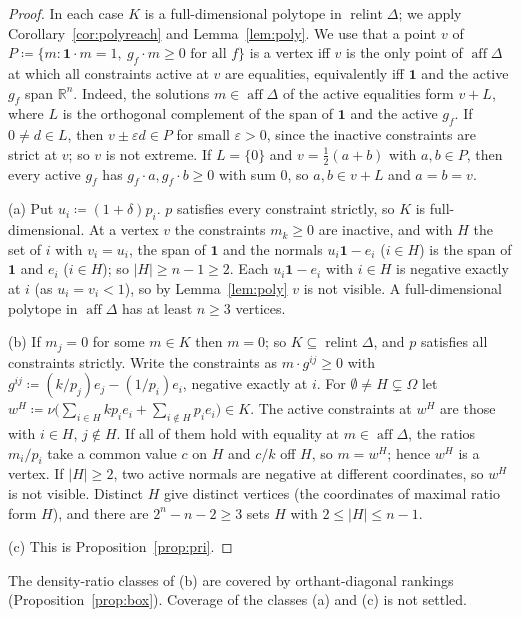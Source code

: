 \documentclass[11pt]{article}
\newcommand{\R}{\mathbb{R}}
\newcommand{\one}{\mathbf{1}}
\DeclareMathOperator{\relint}{relint}
\DeclareMathOperator{\aff}{aff}
\theoremstyle{plain}
\theoremstyle{definition}
\theoremstyle{remark}
\begin{document}
\begin{proof}
In each case $K$ is a full-dimensional polytope in $\relint\Delta$; we apply
Corollary~\ref{cor:polyreach} and Lemma~\ref{lem:poly}. We use that a point $v$ of
$P\coloneqq\{m:\one\cdot m=1,\ g_f\cdot m\ge0\text{ for all }f\}$ is a vertex iff $v$ is
the only point of $\aff\Delta$ at which all constraints active at $v$ are equalities,
equivalently iff $\one$ and the active $g_f$ span $\R^n$. Indeed, the solutions $m\in
\aff\Delta$ of the active equalities form $v+L$, where $L$ is the orthogonal complement
of the span of $\one$ and the active $g_f$. If $0\ne d\in L$, then $v\pm\varepsilon d\in P$
for small $\varepsilon>0$, since the inactive constraints are strict at $v$; so $v$ is
not extreme. If $L=\{0\}$ and $v=\frac12(a+b)$ with $a,b\in P$, then every active $g_f$
has $g_f\cdot a,g_f\cdot b\ge0$ with sum $0$, so $a,b\in v+L$ and $a=b=v$.

(a) Put $u_i\coloneqq(1+\delta)p_i$. $p$ satisfies every constraint strictly, so $K$ is
full-dimensional. At a vertex $v$ the constraints $m_k\ge0$ are inactive, and with $H$ the
set of $i$ with $v_i=u_i$, the span of $\one$ and the normals $u_i\one-e_i$ ($i\in H$)
is the span of $\one$ and $e_i$ ($i\in H$); so $|H|\ge n-1\ge2$. Each $u_i\one-e_i$ with
$i\in H$ is negative exactly at $i$ (as $u_i=v_i<1$), so by Lemma~\ref{lem:poly} $v$ is
not visible. A full-dimensional polytope in $\aff\Delta$ has at least $n\ge3$ vertices.

(b) If $m_j=0$ for some $m\in K$ then $m=0$; so $K\subseteq\relint\Delta$, and $p$
satisfies all constraints strictly. Write the constraints as $m\cdot g^{ij}\ge0$ with
$g^{ij}\coloneqq(k/p_j)e_j-(1/p_i)e_i$, negative exactly at $i$. For $\emptyset\neq H
\subsetneq\Omega$ let $w^H\coloneqq\nu\bigl(\sum_{i\in H}kp_ie_i+\sum_{i\notin H}p_ie_i
\bigr)\in K$. The active constraints at $w^H$ are those with $i\in H$, $j\notin H$. If all
of them hold with equality at $m\in\aff\Delta$, the ratios $m_i/p_i$ take a common value
$c$ on $H$ and $c/k$ off $H$, so $m=w^H$; hence $w^H$ is a vertex. If $|H|\ge2$, two
active normals are negative at different coordinates, so $w^H$ is not visible. Distinct
$H$ give distinct vertices (the coordinates of maximal ratio form $H$), and there are
$2^n-n-2\ge3$ sets $H$ with $2\le|H|\le n-1$.

(c) This is Proposition~\ref{prop:pri}.
\end{proof}

The density-ratio classes of (b) are covered by orthant-diagonal rankings
(Proposition~\ref{prop:box}). Coverage of the classes (a) and (c) is not settled.
\end{document}
